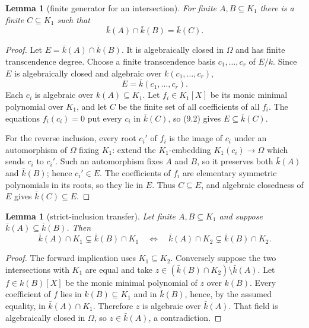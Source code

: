 \documentclass[11pt,oneside]{article}
\newtheorem{lemma}[theorem]{Lemma}
\theoremstyle{definition}
\theoremstyle{remark}
\begin{document}
\begin{lemma}[finite generator for an intersection]\label{lem:finite-intersection-generator}
For finite $A,B\subseteq K_1$ there is a finite $C\subseteq K_1$ such that
\[
 \bar k(A)\cap\bar k(B)=\bar k(C).                             \tag{9.1}
\]
\end{lemma}
\begin{proof}
Let $E=\bar k(A)\cap\bar k(B)$.  It is algebraically closed in $\Omega$ and has finite
transcendence degree.  Choose a finite transcendence basis
$c_1,\ldots,c_r$ of $E/k$.  Since $E$ is algebraically closed and algebraic over
$k(c_1,\ldots,c_r)$,
\[
 E=\bar k(c_1,\ldots,c_r).                                    \tag{9.2}
\]
Each $c_i$ is algebraic over $k(A)\subseteq K_1$.  Let $f_i\in K_1[X]$ be its monic
minimal polynomial over $K_1$, and let $C$ be the finite set of all coefficients of all
$f_i$.  The equations $f_i(c_i)=0$ put every $c_i$ in $\bar k(C)$, so (9.2) gives
$E\subseteq\bar k(C)$.

For the reverse inclusion, every root $c_i'$ of $f_i$ is the image of $c_i$ under an
automorphism of $\Omega$ fixing $K_1$: extend the $K_1$-embedding
$K_1(c_i)\to\Omega$ which sends $c_i$ to $c_i'$.  Such an automorphism fixes $A$ and
$B$, so it preserves both $\bar k(A)$ and $\bar k(B)$; hence $c_i'\in E$.  The
coefficients of $f_i$ are elementary symmetric polynomials in its roots, so they lie in
$E$.  Thus $C\subseteq E$, and algebraic closedness of $E$ gives
$\bar k(C)\subseteq E$.
\end{proof}

\begin{lemma}[strict-inclusion transfer]\label{lem:strict-transfer}
Let finite $A,B\subseteq K_1$ and suppose $\bar k(A)\subseteq\bar k(B)$.  Then
\[
 \bar k(A)\cap K_1\subsetneq\bar k(B)\cap K_1
 \quad\Longleftrightarrow\quad
 \bar k(A)\cap K_2\subsetneq\bar k(B)\cap K_2.                 \tag{9.3}
\]
\end{lemma}
\begin{proof}
The forward implication uses $K_1\subseteq K_2$.  Conversely suppose the two
intersections with $K_1$ are equal and take
$z\in(\bar k(B)\cap K_2)\setminus\bar k(A)$.  Let
$f\in k(B)[X]$ be the monic minimal polynomial of $z$ over $k(B)$.  Every coefficient
of $f$ lies in $k(B)\subseteq K_1$ and in $\bar k(B)$, hence, by the assumed equality,
in $\bar k(A)\cap K_1$.  Therefore $z$ is algebraic over $\bar k(A)$.  That field is
algebraically closed in $\Omega$, so $z\in\bar k(A)$, a contradiction.
\end{proof}
\end{document}
